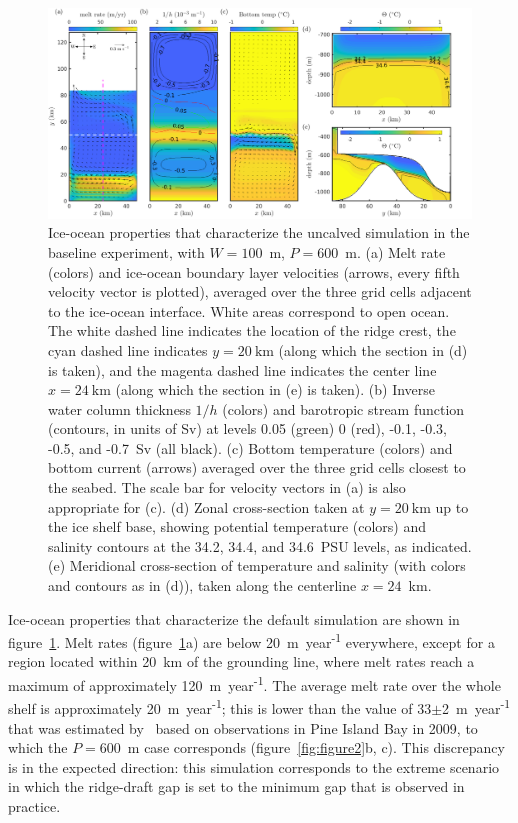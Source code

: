 \documentclass[draft]{agujournal2019}
\begin{document}
\begin{figure}
    \centering
    \includegraphics[width = \textwidth]{../make_figures/plots/figure3.pdf}
    \caption{Ice-ocean properties that characterize the uncalved simulation in the baseline experiment, with $W = 100$~m, $P = 600$~m. (a) Melt rate (colors) and ice-ocean boundary layer velocities (arrows, every fifth velocity vector is plotted), averaged over the three grid cells adjacent to the ice-ocean interface. White areas correspond to open ocean. The white dashed line indicates the location of the ridge crest, the cyan dashed line indicates $y=20~\text{km}$ (along which the section in (d) is taken), and the magenta dashed line indicates the center line $x = 24~\text{km}$ (along which the section in (e) is taken). (b) Inverse water column thickness $1/h$ (colors) and barotropic stream function (contours, in units of Sv) at levels 0.05 (green) 0 (red), -0.1, -0.3, -0.5, and -0.7~Sv (all black). (c) Bottom temperature (colors) and bottom current (arrows) averaged over the three grid cells closest to the seabed. The scale bar for velocity vectors in (a) is also appropriate for (c). (d) Zonal cross-section taken at $y=20~\text{km}$ up to the ice shelf base, showing potential temperature (colors) and salinity contours at the 34.2, 34.4, and 34.6~PSU levels, as indicated. (e) Meridional cross-section of temperature and salinity (with colors and contours as in (d)), taken along the centerline $x = 24$~km.}
    \label{fig:figure3}
\end{figure}

Ice-ocean properties that characterize the default simulation are shown in figure~\ref{fig:figure3}. Melt rates (figure~\ref{fig:figure3}a) are below  20~m~year\textsuperscript{-1} everywhere, except for a region located within 20~km of the grounding line, where melt rates reach a maximum of approximately 120~m~year\textsuperscript{-1}. The average melt rate over the whole shelf is approximately 20~m~year\textsuperscript{-1}; this is lower than the value of 33$\pm$2~m~year\textsuperscript{-1} that was estimated by~ based on observations in Pine Island Bay in 2009, to which the $P=600$~m case corresponds (figure~\ref{fig:figure2}b, c). This discrepancy is in the expected direction: this simulation corresponds to the extreme scenario in which the ridge-draft gap is set to the minimum gap that is observed in practice.
\end{document}
